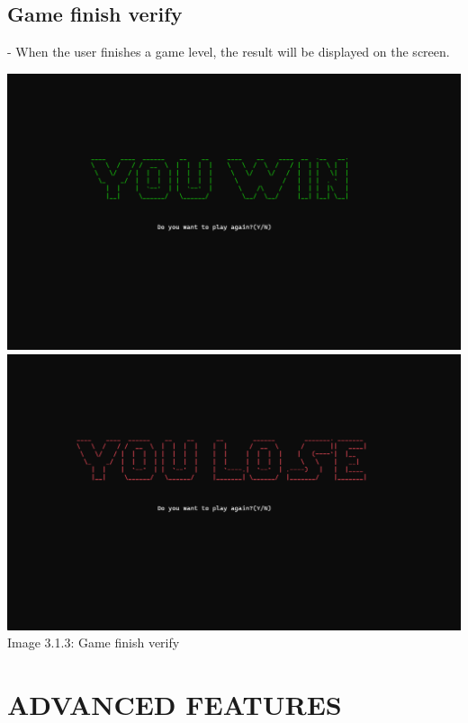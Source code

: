\documentclass[12pt,a4paper]{report}
\begin{document}
\subsection{Game finish verify}
- When the user finishes a game level, the result will be displayed on the screen.\\
\begin{center}
    \includegraphics[scale=0.3]{You Win.png}\\
    \includegraphics[scale=0.3]{You Lose.png}\\[0.2cm]
    Image 3.1.3: Game finish verify
\end{center}

\section{ADVANCED FEATURES}
\end{document}

